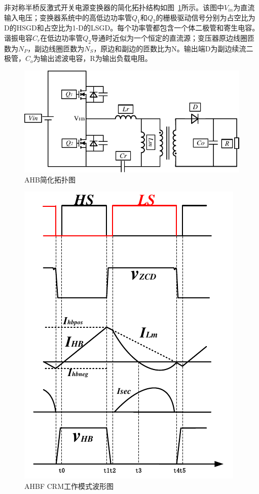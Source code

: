 非对称半桥反激式开关电源变换器的简化拓扑结构如图~\ref{fig:AHB简化拓扑图}所示。该图中$V_{in}$为直流输入电压；变换器系统中的高低边功率管$Q_1$和$Q_2$的栅极驱动信号分别为占空比为D的HSGD和占空比为1-D的LSGD。每个功率管都包含一个体二极管和寄生电容。谐振电容$C_r$在低边功率管$Q_2$导通时近似为一个恒定的直流源；变压器原边线圈匝数为$N_P$，副边线圈匝数为$N_S$，原边和副边的匝数比为N。输出端D为副边续流二极管，$C_o$为输出滤波电容，R为输出负载电阻。

\begin{figure}[htbp] 
    \centering
    \includegraphics[width=0.8\linewidth]{figures/AHB简化拓扑图.pdf}
    \caption{AHB简化拓扑图}
    \label{fig:AHB简化拓扑图}
\end{figure}

\begin{figure}[htbp] 
    \centering
    \includegraphics[width=0.8\linewidth]{figures/BCM工作波形图.pdf}
    \caption{AHBF CRM工作模式波形图}
    \label{fig:CRM模式波形图}
\end{figure}
								
